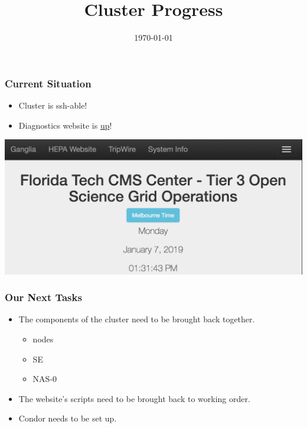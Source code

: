 \documentclass{beamer}
\title{Cluster Progress}
\date{\today}
\begin{document}

\begin{frame}
\titlepage
\end{frame}



\begin{frame}

  \frametitle{Current Situation}
  
  \begin{itemize}
    \item Cluster is ssh-able!
    \item Diagnostics website is
      \href{http://uscms1.fltech-grid3.fit.edu/diagnostics/}{up}!
  \end{itemize}
  
  \begin{center}
    \includegraphics[scale=0.4]{website.png}
  \end{center}

\end{frame}



\begin{frame}

  \frametitle{Our Next Tasks}

  \begin{itemize}
    \item The components of the cluster need to be brought back together.
    \begin{itemize}
      \item nodes
      \item SE
      \item NAS-0
    \end{itemize}
    \item The website's scripts need to be brought back to working order.
    \item Condor needs to be set up.
  \end{itemize}

\end{frame}

\end{document}

